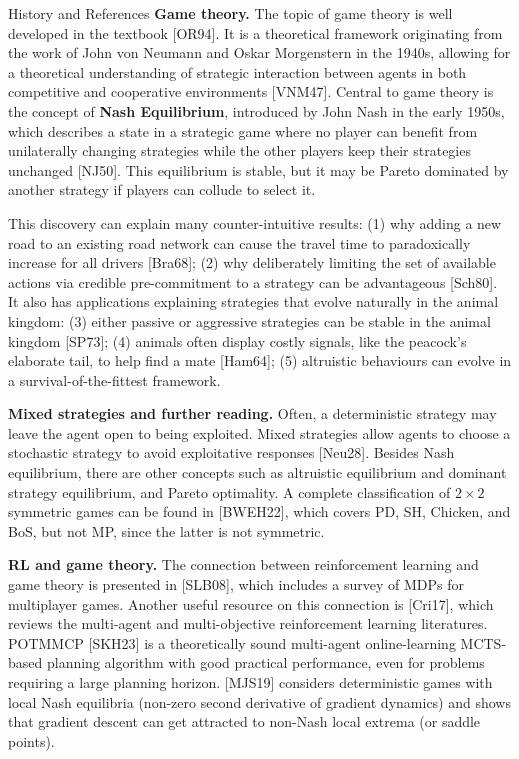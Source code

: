 \documentclass[aspectratio=169,10pt]{beamer}
\begin{document}
\begin{frame}[allowframebreaks]{History and References}
  \textbf{Game theory.} The topic of game theory is well developed in the
  textbook {\footnotesize[OR94]}. It is a theoretical framework
  originating from the work of John von Neumann and Oskar Morgenstern in
  the 1940s, allowing for a theoretical understanding of strategic
  interaction between agents in both competitive and cooperative
  environments {\footnotesize[VNM47]}. Central to game theory is the
  concept of \textbf{Nash Equilibrium}, introduced by John Nash in the
  early 1950s, which describes a state in a strategic game where no
  player can benefit from unilaterally changing strategies while the
  other players keep their strategies unchanged {\footnotesize[NJ50]}.
  This equilibrium is stable, but it may be Pareto dominated by another
  strategy if players can collude to select it.

  \vspace{0.3em}
  This discovery can explain many counter-intuitive results: (1) why
  adding a new road to an existing road network can cause the travel time
  to paradoxically increase for all drivers {\footnotesize[Bra68]}; (2)
  why deliberately limiting the set of available actions via credible
  pre-commitment to a strategy can be advantageous {\footnotesize[Sch80]}.
  It also has applications explaining strategies that evolve naturally in
  the animal kingdom: (3) either passive or aggressive strategies can be
  stable in the animal kingdom {\footnotesize[SP73]}; (4) animals often
  display costly signals, like the peacock's elaborate tail, to help find
  a mate {\footnotesize[Ham64]}; (5) altruistic behaviours can evolve in a
  survival-of-the-fittest framework.

  \framebreak
  \textbf{Mixed strategies and further reading.} Often, a deterministic
  strategy may leave the agent open to being exploited. Mixed strategies
  allow agents to choose a stochastic strategy to avoid exploitative
  responses {\footnotesize[Neu28]}. Besides Nash equilibrium, there are
  other concepts such as altruistic equilibrium and dominant strategy
  equilibrium, and Pareto optimality. A complete classification of
  $2\times2$ symmetric games can be found in {\footnotesize[BWEH22]},
  which covers PD, SH, Chicken, and BoS, but not MP, since the latter is
  not symmetric.

  \vspace{0.3em}
  \textbf{RL and game theory.} The connection between reinforcement
  learning and game theory is presented in {\footnotesize[SLB08]}, which
  includes a survey of MDPs for multiplayer games. Another useful resource
  on this connection is {\footnotesize[Cri17]}, which reviews the
  multi-agent and multi-objective reinforcement learning literatures.
  POTMMCP {\footnotesize[SKH23]} is a theoretically sound multi-agent
  online-learning MCTS-based planning algorithm with good practical
  performance, even for problems requiring a large planning horizon.
  {\footnotesize[MJS19]} considers deterministic games with local Nash
  equilibria (non-zero second derivative of gradient dynamics) and shows
  that gradient descent can get attracted to non-Nash local extrema (or
  saddle points).


\end{frame}
\end{document}
